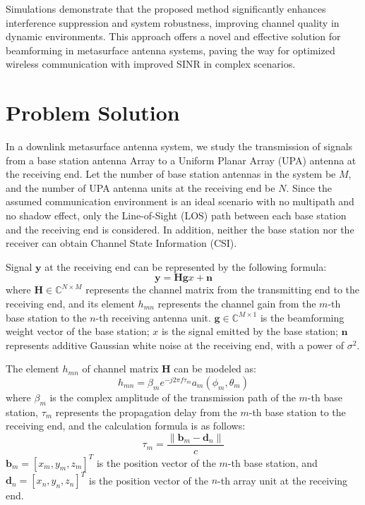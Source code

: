 \documentclass[lettersize,journal]{IEEEtran}
\begin{document}
Simulations demonstrate that the proposed method significantly enhances interference suppression and system robustness, improving channel quality in dynamic environments. This approach offers a novel and effective solution for beamforming in metasurface antenna systems, paving the way for optimized wireless communication with improved SINR in complex scenarios.


\section{Problem Solution}

In a downlink metasurface antenna system, we study the transmission of signals from a base station antenna Array to a Uniform Planar Array (UPA) antenna at the receiving end. Let the number of base station antennas in the system be \(M\), and the number of UPA antenna units at the receiving end be \(N\). Since the assumed communication environment is an ideal scenario with no multipath and no shadow effect, only the Line-of-Sight (LOS) path between each base station and the receiving end is considered. In addition, neither the base station nor the receiver can obtain Channel State Information (CSI).

Signal \(\mathbf{y}\) at the receiving end can be represented by the following formula:
\begin{equation}
  \mathbf{y} = \mathbf{H} \mathbf{g} x + \mathbf{n} \label{eq:y_signal}
\end{equation}
where \(\mathbf{H} \in \mathbb{C}^{N \times M}\) represents the channel matrix from the transmitting end to the receiving end, and its element \(h_{mn}\) represents the channel gain from the \(m\)-th base station to the \(n\)-th receiving antenna unit. \(\mathbf{g} \in \mathbb{C}^{M \times 1}\) is the beamforming weight vector of the base station; \(x\) is the signal emitted by the base station; \(\mathbf{n}\) represents additive Gaussian white noise at the receiving end, with a power of \(\sigma^{2}\).

The element \(h_{mn}\) of channel matrix \(\mathbf{H}\) can be modeled as:
\begin{equation}
  h_{mn} = \beta_m e^{-j 2 \pi f \tau_m} a_m(\phi_m, \theta_m) \label{eq:h_mn}
\end{equation}
where \(\beta_{m}\) is the complex amplitude of the transmission path of the \(m\)-th base station, \(\tau_{m}\) represents the propagation delay from the \(m\)-th base station to the receiving end, and the calculation formula is as follows:
\begin{equation}
  \tau_m = \frac{\|\mathbf{b}_m - \mathbf{d}_n\|}{c} \label{eq:tau_m}
\end{equation}
\(\mathbf{b}_{m} = \left[ x_{m}, y_{m}, z_{m} \right]^{T}\) is the position vector of the \(m\)-th base station, and \(\mathbf{d}_{n} = \left[ x_{n}, y_{n}, z_{n} \right]^{T}\) is the position vector of the \(n\)-th array unit at the receiving end.
\end{document}
